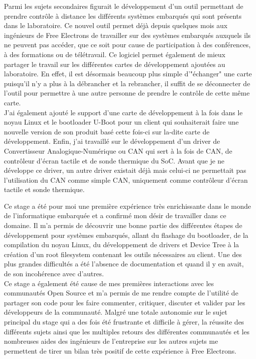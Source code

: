 Parmi les sujets secondaires figurait le développement d'un outil permettant de prendre contrôle à distance les différents systèmes embarqués qui sont présents dans le laboratoire. Ce nouvel outil permet déjà depuis quelques mois aux ingénieurs de Free Electrons de travailler sur des systèmes embarqués auxquels ils ne peuvent pas accéder, que ce soit pour cause de participation à des conférences, à des formations ou de télétravail. Ce logiciel permet également de mieux partager le travail sur les différentes cartes de développement ajoutées au laboratoire. En effet, il est désormais beaucoup plus simple d'"échanger" une carte puisqu'il n'y a plus à la débrancher et la rebrancher, il suffit de se déconnecter de l'outil pour permettre à une autre personne de prendre le contrôle de cette même carte.\\
J'ai également ajouté le support d'une carte de développement à la fois dans le noyau Linux et le bootloader U-Boot pour un client qui souhaiterait faire une nouvelle version de son produit basé cette fois-ci sur la-dite carte de développement. Enfin, j'ai travaillé sur le développement d'un driver de Convertisseur Analogique-Numérique ou CAN qui sert à la fois de CAN, de contrôleur d'écran tactile et de sonde thermique du SoC. Avant que je ne développe ce driver, un autre driver existait déjà mais celui-ci ne permettait pas l'utilisation du CAN comme simple CAN, uniquement comme contrôleur d'écran tactile et sonde thermique.

Ce stage a été pour moi une première expérience très enrichissante dans le monde de l'informatique embarquée et a confirmé mon désir de travailler dans ce domaine. Il m'a permis de découvrir une bonne partie des différentes étapes de développement pour systèmes embarqués, allant du flashage du bootloader, de la compilation du noyau Linux, du développement de drivers et Device Tree à la création d'un root filesystem contenant les outils nécessaires au client. Une des plus grandes difficultés a été l'absence de documentation et quand il y en avait, de son incohérence avec d'autres.\\
Ce stage a également été cause de mes premières interactions avec les communautés Open Source et m'a permis de me rendre compte de l'utilité de partager son code pour les faire commenter, critiquer, discuter et valider par les développeurs de la communauté. Malgré une totale autonomie sur le sujet principal du stage qui a des fois été frustrante et difficile à gérer, la réussite des différents sujets ainsi que les multiples retours des différentes communautés et les nombreuses aides des ingénieurs de l'entreprise sur les autres sujets me permettent de tirer un bilan très positif de cette expérience à Free Electrons.
